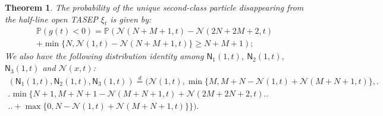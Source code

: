 \documentclass[12pt,a4paper]{amsart}
\newtheorem{theorem}{Theorem} %
\theoremstyle{remark}
\numberwithin{equation}{section} \numberwithin{theorem}{section}
\begin{document}
\begin{theorem}
\label{thm:two-shock}
The probability of the unique second-class particle disappearing from the half-line open TASEP $\xi_t$ is given by:
\begin{multline}
\label{eq:four-color-disappear}
\mathbb{P} \left( g(t)<0 \right) = \mathbb{P} \left( \mathcal{N}(N+M+1,t)-\mathcal{N}(2N+2M+2,t)\right.\\
\left.+\min\{N, \mathcal{N}(1,t)-\mathcal{N}(N+M+1,t)\}\ge N+M+1 \right);
\end{multline}
We also have the following distribution identity among $\mathsf{N}_{1}(1,t)$, $\mathsf{N}_{2}(1,t)$, $\mathsf{N}_{3}(1,t)$  and $\mathcal{N}(x,t)$:
\begin{multline}
\label{eq:four-color-remain}
\left(\mathsf{N}_{1}(1,t) , \mathsf{N}_{2}(1,t), \mathsf{N}_{3}(1,t)  \right) \stackrel{d}{=} \bigl( \mathcal{N}(1, t) , \min\{M, M+N-\mathcal{N}(1,t)+\mathcal{N}(M+N+1,t)\},\bigr.\\
\bigl.\min \bigl\{N+1, M+N+1-\mathcal{N}(M+N+1,t)+\mathcal{N}(2M+2N+2,t)\bigr.\bigr.\\
\bigl.\bigl.+\max\{0, N-\mathcal{N}(1,t)+\mathcal{N}(M+N+1,t)\}\bigr\}\bigr).
\end{multline}
\end{theorem}
\end{document}
